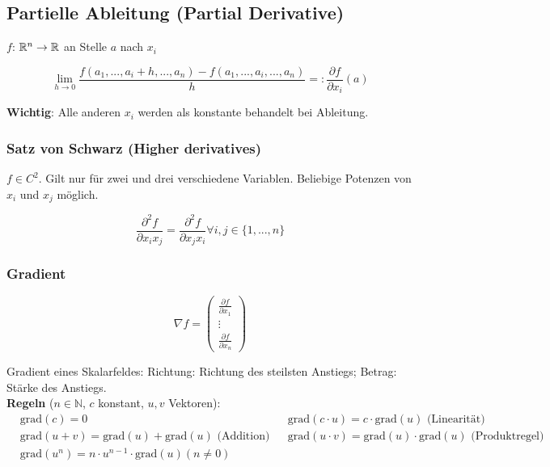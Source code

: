 \subsection{Partielle Ableitung (Partial Derivative)}

$f$: $\mathbb{R}^n \rightarrow \mathbb{R}$ an Stelle $a$ nach $x_i$

\[
    \lim_{h \rightarrow 0} \frac{f(a_1, ..., a_i + h, ..., a_n) - f(a_1, ..., a_i, ..., a_n)}{h} =: \frac{\partial f}{\partial x_i}(a)
\]

\textbf{Wichtig}: Alle anderen $x_i$ werden als konstante behandelt bei Ableitung.

\subsubsection{Satz von Schwarz (Higher derivatives)}

$f \in C^2$. Gilt nur für zwei und drei verschiedene Variablen. Beliebige Potenzen von $x_i$ und $x_j$ möglich.

\[
    \frac{\partial^2 f}{\partial x_i x_j} = \frac{\partial^2 f}{\partial x_j x_i} \forall i, j \in \{1, ..., n\}
\]


\subsubsection{Gradient}

\[
    \nabla f =
        \begin{pmatrix}
            \frac{\partial f}{\partial x_1}\\
            \vdots\\
            \frac{\partial f}{\partial x_n}
        \end{pmatrix}
\]

Gradient eines Skalarfeldes: Richtung: Richtung des steilsten Anstiegs; Betrag: Stärke des Anstiegs.\\

\textbf{Regeln} ($n \in \mathbb{N}$, $c$ konstant, $u, v$ Vektoren):
\begin{align*}
    &\text{grad}(c) = 0 &
    &\text{grad}(c \cdot u) = c \cdot \text{grad}(u) \text{  (Linearität)} \\
    &\text{grad}(u + v) = \text{grad}(u) + \text{grad}(u) \text{  (Addition)} &
    &\text{grad}(u \cdot v) = \text{grad}(u) \cdot \text{grad}(u) 
    \text{  (Produktregel)} \\
    &\text{grad}(u^n) = n \cdot u^{n-1} \cdot \text{grad}(u) (n\neq 0) 
\end{align*}
